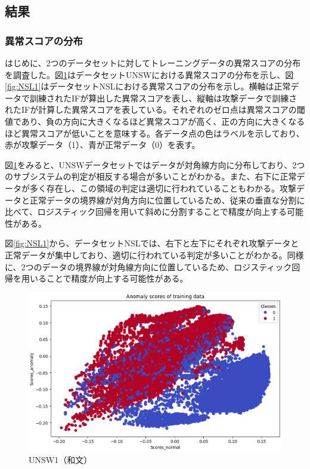\documentclass{css}
\begin{document}
\subsection{結果}

\subsubsection{異常スコアの分布}
はじめに、2つのデータセットに対してトレーニングデータの異常スコアの分布を調査した。図\ref{fig:UNSW1}はデータセットUNSWにおける異常スコアの分布を示し、図\ref{fig:NSL1}はデータセットNSLにおける異常スコアの分布を示し。横軸は正常データで訓練されたIFが算出した異常スコアを表し、縦軸は攻撃データで訓練されたIFが計算した異常スコアを表している。それぞれのゼロ点は異常スコアの閾値であり、負の方向に大きくなるほど異常スコアが高く、正の方向に大きくなるほど異常スコアが低いことを意味する。各データ点の色はラベルを示しており、赤が攻撃データ（1）、青が正常データ（0）を表す。

図\ref{fig:UNSW1}をみると、UNSWデータセットではデータが対角線方向に分布しており、2つのサブシステムの判定が相反する場合が多いことがわかる。また、右下に正常データが多く存在し、この領域の判定は適切に行われていることもわかる。攻撃データと正常データの境界線が対角方向に位置しているため、従来の垂直な分割に比べて、ロジスティック回帰を用いて斜めに分割することで精度が向上する可能性がある。

図\ref{fig:NSL1}から、データセットNSLでは、右下と左下にそれぞれ攻撃データと正常データが集中しており、適切に行われている判定が多いことがわかる。同様に、2つのデータの境界線が対角線方向に位置しているため、ロジスティック回帰を用いることで精度が向上する可能性がある。

\begin{figure}[tb]
    \centering
    \includegraphics[width=\linewidth]{pictures/eps/UNSW1.eps}
    \caption{UNSW1（和文）}
    \label{fig:UNSW1}
\end{figure}
\end{document}
